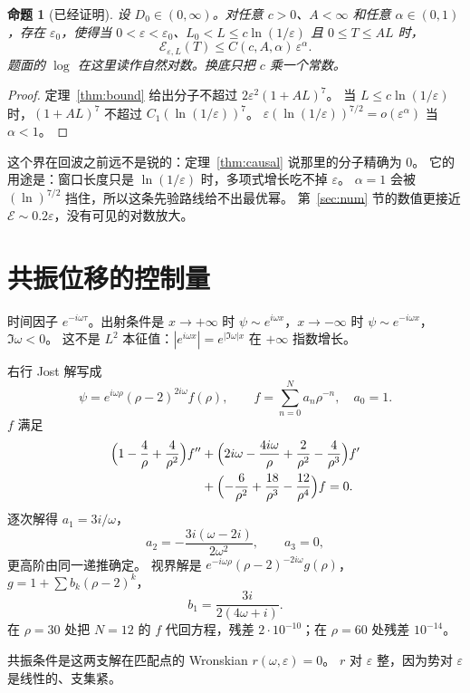 \documentclass[11pt]{ctexart}
\newtheorem{proposition}[theorem]{命题}
\theoremstyle{definition}
\theoremstyle{remark}
\newcommand{\eps}{\varepsilon}
\newcommand{\cE}{\mathcal E}
\begin{document}
\begin{proposition}[已经证明]
\label{prop:window}
设 $D_0\in(0,\infty)$。对任意 $c>0$、$A<\infty$ 和任意 $\alpha\in(0,1)$，存在 $\eps_0$，使得当 $0<\eps<\eps_0$、$L_0<L\le c\ln(1/\eps)$ 且 $0\le T\le AL$ 时，
\[
\cE_{\eps,L}(T)\le C(c,A,\alpha)\,\eps^\alpha.
\]
题面的 $\log$ 在这里读作自然对数。换底只把 $c$ 乘一个常数。
\end{proposition}

\begin{proof}
定理~\ref{thm:bound} 给出分子不超过 $2\eps^2(1+AL)^7$。
当 $L\le c\ln(1/\eps)$ 时，$(1+AL)^7$ 不超过 $C_1(\ln(1/\eps))^7$。
$\eps(\ln(1/\eps))^{7/2}=o(\eps^\alpha)$ 当 $\alpha<1$。
\end{proof}

这个界在回波之前远不是锐的：定理~\ref{thm:causal} 说那里的分子精确为 $0$。
它的用途是：窗口长度只是 $\ln(1/\eps)$ 时，多项式增长吃不掉 $\eps$。
$\alpha=1$ 会被 $(\ln)^{7/2}$ 挡住，所以这条先验路线给不出最优幂。
第~\ref{sec:num} 节的数值更接近 $\cE\sim 0.2\eps$，没有可见的对数放大。

\section{共振位移的控制量}
\label{sec:qnm}

时间因子 $e^{-i\omega\tau}$。出射条件是 $x\to+\infty$ 时 $\psi\sim e^{i\omega x}$，$x\to-\infty$ 时 $\psi\sim e^{-i\omega x}$，$\Im\omega<0$。
这不是 $L^2$ 本征值：$|e^{i\omega x}|=e^{|\Im\omega|x}$ 在 $+\infty$ 指数增长。

右行 Jost 解写成
\[
\psi=e^{i\omega\rho}(\rho-2)^{2i\omega}f(\rho),\qquad f=\sum_{n=0}^{N}a_n\rho^{-n},\quad a_0=1.
\]
$f$ 满足
\begin{align*}
\Bigl(1-\frac4\rho+\frac4{\rho^2}\Bigr)f''
&+\Bigl(2i\omega-\frac{4i\omega}\rho+\frac2{\rho^2}-\frac4{\rho^3}\Bigr)f'\\
&+\Bigl(-\frac6{\rho^2}+\frac{18}{\rho^3}-\frac{12}{\rho^4}\Bigr)f=0.
\end{align*}
逐次解得 $a_1=3i/\omega$，
\[
a_2=-\frac{3i(\omega-2i)}{2\omega^2},\qquad a_3=0,
\]
更高阶由同一递推确定。
视界解是 $e^{-i\omega\rho}(\rho-2)^{-2i\omega}g(\rho)$，$g=1+\sum b_k(\rho-2)^k$，
\[
b_1=\frac{3i}{2(4\omega+i)}.
\]
在 $\rho=30$ 处把 $N=12$ 的 $f$ 代回方程，残差 $2\cdot10^{-10}$；在 $\rho=60$ 处残差 $10^{-14}$。

共振条件是这两支解在匹配点的 Wronskian $r(\omega,\eps)=0$。
$r$ 对 $\eps$ 整，因为势对 $\eps$ 是线性的、支集紧。
\end{document}
